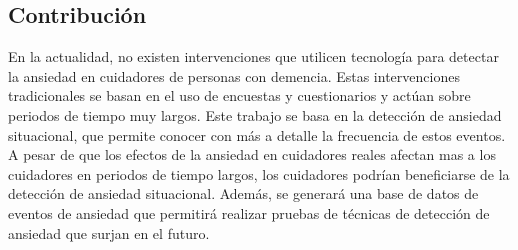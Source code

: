 \subsection{Contribuci\'on}
En la actualidad, no existen intervenciones que utilicen tecnolog\'ia para detectar la ansiedad en cuidadores de personas con demencia. Estas intervenciones tradicionales se basan en el uso de encuestas y cuestionarios y actúan sobre periodos de tiempo muy largos. Este trabajo se basa en la detecci\'on de ansiedad situacional, que permite conocer con m\'as a detalle la frecuencia de estos eventos. A pesar de que los efectos de la ansiedad en cuidadores reales afectan mas a los cuidadores en periodos de tiempo largos, los cuidadores podr\'ian beneficiarse de la detecci\'on de ansiedad situacional.
	Adem\'as, se generar\'a una base de datos de eventos de ansiedad que permitir\'a realizar pruebas de t\'ecnicas de detecci\'on de ansiedad que surjan en el futuro.


	
